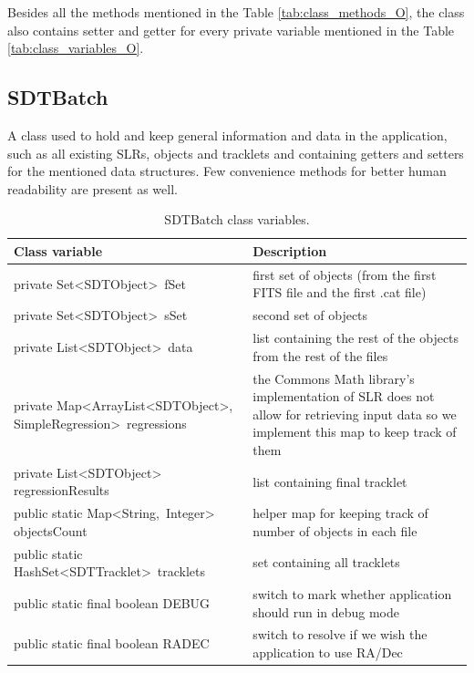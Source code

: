 	Besides all the methods mentioned in the Table \ref{tab:class_methods_O}, the class also contains setter and getter for every private variable mentioned in the Table \ref{tab:class_variables_O}.
	
\newpage

\subsection{SDTBatch}\label{subsec:batch}

	A class used to hold and keep general information and data in the application, such as all existing SLRs, objects and tracklets and containing getters and setters for the mentioned data structures. Few convenience methods for better human readability are present as well.
	
\begin{table}[H]
\centering
\setlength{\extrarowheight}{2pt}
\begin{tabularx}{\textwidth}{|X|X|}
\hline
\textbf{Class variable} & \textbf{Description} \\ \hline
private \mbox{Set<SDTObject> fSet} & first set of objects (from the first FITS file and the first .cat file) \\ \hline
private \mbox{Set<SDTObject> sSet} & second set of objects \\ \hline
private \mbox{List<SDTObject> data} & list containing the rest of the objects from the rest of the files \\ \hline
private \mbox{Map<ArrayList<SDTObject>,} \mbox{SimpleRegression> regressions} & the Commons Math library's implementation of SLR does not allow for retrieving input data so we implement this map to keep track of them \\ \hline
private \mbox{List<SDTObject>} \mbox{regressionResults} & list containing final tracklet \\ \hline
public static \mbox{Map<String, Integer>} \mbox{objectsCount} & helper map for keeping track of number of objects in each file \\ \hline
public static \mbox{HashSet<SDTTracklet> tracklets} & set containing all tracklets \\ \hline
public static final boolean \mbox{DEBUG} & switch to mark whether application should run in debug mode \\ \hline
public static final boolean \mbox{RADEC} & switch to resolve if we wish the application to use RA/Dec \\ \hline
\end{tabularx}
\caption{SDTBatch class variables.}
\label{tab:class_variables_B}
\end{table}

